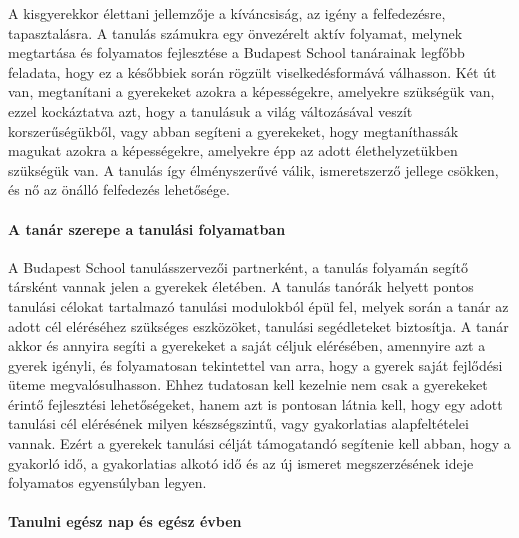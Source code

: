 A kisgyerekkor élettani jellemzője a kíváncsiság, az igény a
felfedezésre, tapasztalásra. A tanulás számukra egy önvezérelt aktív
folyamat, melynek megtartása és folyamatos fejlesztése a Budapest School
tanárainak legfőbb feladata, hogy ez a későbbiek során rögzült
viselkedésformává válhasson. Két út van, megtanítani a gyerekeket azokra
a képességekre, amelyekre szükségük van, ezzel kockáztatva azt, hogy a
tanulásuk a világ változásával veszít korszerűségükből, vagy abban
segíteni a gyerekeket, hogy megtaníthassák magukat azokra a
képességekre, amelyekre épp az adott élethelyzetükben szükségük van. A
tanulás így élményszerűvé válik, ismeretszerző jellege csökken, és nő az
önálló felfedezés lehetősége.

\paragraph{A tanár szerepe a tanulási
folyamatban}

A Budapest School tanulásszervezői partnerként, a tanulás folyamán
segítő társként vannak jelen a gyerekek életében. A tanulás tanórák
helyett pontos tanulási célokat tartalmazó tanulási modulokból épül fel,
melyek során a tanár az adott cél eléréséhez szükséges eszközöket,
tanulási segédleteket biztosítja. A tanár akkor és annyira segíti a
gyerekeket a saját céljuk elérésében, amennyire azt a gyerek igényli, és
folyamatosan tekintettel van arra, hogy a gyerek saját fejlődési üteme
megvalósulhasson. Ehhez tudatosan kell kezelnie nem csak a gyerekeket
érintő fejlesztési lehetőségeket, hanem azt is pontosan látnia kell,
hogy egy adott tanulási cél elérésének milyen készségszintű, vagy
gyakorlatias alapfeltételei vannak. Ezért a gyerekek tanulási célját
támogatandó segítenie kell abban, hogy a gyakorló idő, a gyakorlatias
alkotó idő és az új ismeret megszerzésének ideje folyamatos egyensúlyban
legyen.

\paragraph{Tanulni egész nap és egész évben}


